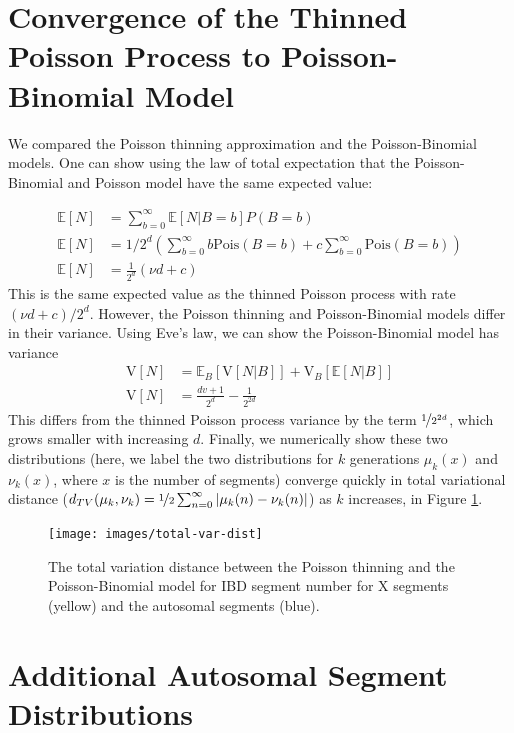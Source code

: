 \documentclass[9pt,twocolumn,twoside]{gsajnl}
\newcommand{\E}{\mathbb{E}}
\newcommand{\V}{\text{V}}
\begin{document}
\newpage
\appendix

\section*{Convergence of the Thinned Poisson Process to Poisson-Binomial Model}
\label{ap:pois-thin}

We compared the Poisson thinning approximation and the Poisson-Binomial models.
One can show using the law of total expectation that the Poisson-Binomial and
Poisson model have the same expected value:

\begin{align}
  \E[N] &= \sum_{b=0}^\infty \E[N | B = b]P(B = b)\\ \nonumber
  \E[N] &= 1/2^d \left( \sum_{b=0}^\infty b \text{Pois}(B = b) + c \sum_{b=0}^\infty \text{Pois}(B = b) \right) \\ \nonumber
  \E[N] &= \frac{1}{2^d} (\nu d + c) 
\end{align}
%
This is the same expected value as the thinned Poisson process with rate $(\nu
d + c)/2^d$. However, the Poisson thinning and Poisson-Binomial models differ
in their variance. Using Eve's law, we can show the Poisson-Binomial model has
variance
%
\begin{align}
  \label{eq:n-variance}
  \V[N] &= \E_B[\V[N | B]] + \V_B[\E[N|B]]\\ \nonumber
  \V[N] &= \frac{dv + 1}{2^d} - \frac{1}{2^{2d}}
\end{align}
%
This differs from the thinned Poisson process variance by the term
$\nicefrac{1}{2^{2d}}$, which grows smaller with increasing $d$. Finally, we
numerically show these two distributions (here, we label the two distributions
for $k$ generations $\mu_k(x)$ and $\nu_k(x)$, where $x$ is the number of
segments) converge quickly in total variational distance ($d_{TV}(\mu_k, \nu_k) =
\nicefrac{1}{2}\sum_{n = 0}^\infty | \mu_k(n) - \nu_k(n) |$) as $k$ increases,
in Figure \ref{fig:total-var-dist}.

\begin{figure}[!ht]
  \centering
  \texttt{[image: images/total-var-dist]}

  \caption{The total variation distance between the Poisson thinning and the
  Poisson-Binomial model for IBD segment number for X segments (yellow) and the
autosomal segments (blue).}

\label{fig:total-var-dist}
\end{figure}

\section*{Additional Autosomal Segment Distributions}
\label{ap:auto-cousin}
\end{document}
